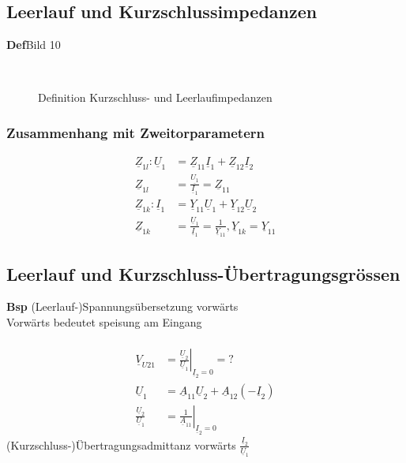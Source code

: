 \subsection{Leerlauf und Kurzschlussimpedanzen}
\textbf{Def}Bild 10\\
\begin{figure}[!h]
\centering
{}
\qquad
{}\\
\qquad
{}
\caption{Definition Kurzschluss- und Leerlaufimpedanzen}
\label{fig:zweitor:impedanzen}
\end{figure}

\subsubsection{Zusammenhang mit Zweitorparametern}
\begin{align}
	\underline{Z}_{1l}:
	\underline{U}_1&=\underline{Z}_{11}\underline{I}_1+\underline{Z}_{12}\underline{I}_2\nonumber\\
	\underline{Z}_{1l}&=\frac{\underline{U_1}}{\underline{I}_1}=\underline{Z}_{11}\nonumber\\
	\underline{Z}_{1k}:
	\underline{I}_1&=\underline{Y}_{11}\underline{U}_1+\underline{Y}_{12}\underline{U}_2\nonumber\\
	\underline{Z}_{1k}&=\frac{\underline{U}_1}{\underline{I}_1}=\frac{1}{\underline{Y}_{11}},
	\underline{Y}_{1k}=\underline{Y}_{11}\nonumber
\end{align}
\subsection{Leerlauf und Kurzschluss-Übertragungsgrössen}
\textbf{Bsp} (Leerlauf-)Spannungsübersetzung vorwärts\\
Vorwärts bedeutet speisung am Eingang\\
\\
\begin{align}
	\underline{V}_{U21}&=\left.\frac{\underline{U}_2}{\underline{U}_1}\right|_{\underline{I}_2=0}=?\nonumber\\
	\underline{U}_1&=\underline{A}_{11}\underline{U}_{2}+\underline{A}_{12}\left(-\underline{I}_2\right)\nonumber\\
	\frac{\underline{U}_2}{\underline{U}_1}&=\left.\frac{1}{\underline{A}_11}\right|_{\underline{I}_2=0}\nonumber
\end{align}
(Kurzschluss-)Übertragungsadmittanz vorwärts
$\frac{\underline{I}_2}{\underline{U}_1}$\\
\\